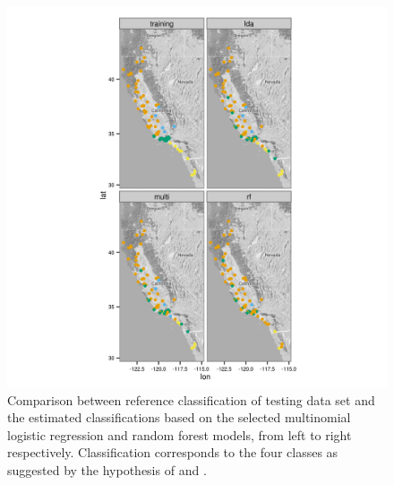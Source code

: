 \documentclass[12pt,letterpaper]{article}\usepackage{graphicx, color}
\begin{document}
\begin{figure}[ht]
  \centering
  \includegraphics[width = \textwidth]{figure/gen_map}
  \caption{Comparison between reference classification of testing data set and the estimated classifications based on the selected multinomial logistic regression and random forest models, from left to right respectively. Classification corresponds to the four classes as suggested by the hypothesis of \citet{Spinks2005} and \citet{Spinks2010}.}
  \label{fig:gen_map}
\end{figure}
\end{document}
